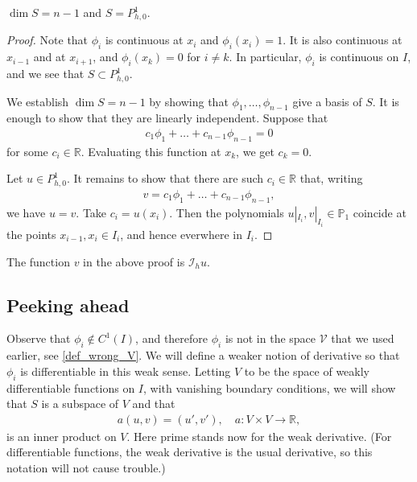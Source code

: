 \documentclass[12pt,oneside,final]{amsart}
\def\R{\mathbb R}
\def\I{\mathcal I}
\begin{document}
\begin{lemma}
$\dim S = n-1$ and $S = P^1_{h,0}$.
\end{lemma}
\begin{proof}
Note that $\phi_i$ is continuous at $x_i$ and $\phi_i(x_i) = 1$.
It is also continuous at $x_{i-1}$ and at $x_{i+1}$,
and $\phi_i(x_k) = 0$ for $i \ne k$. In particular, $\phi_i$ is continuous on $I$, and we see that $S \subset P_{h,0}^1$.

We establish $\dim S = n - 1$ by showing that $\phi_1,\dots,\phi_{n-1}$ give a basis of $S$.
It is enough to show that they are linearly independent.
Suppose that 
    \begin{align*}
c_1 \phi_1 + \dots + c_{n-1} \phi_{n-1} = 0
    \end{align*}
for some $c_i \in \R$. Evaluating this function at $x_k$, we get 
$c_k = 0$.

Let $u \in P^1_{h,0}$. It remains to show that there are such $c_i \in \R$ that, writing
    \begin{align*}
v = c_1 \phi_1 + \dots + c_{n-1} \phi_{n-1},
    \end{align*}
we have $u = v$. 
Take $c_i = u(x_i)$. Then 
the polynomials
$u|_{I_i}, v|_{I_i} \in \mathbb P_1$ 
coincide at the points $x_{i-1}, x_i \in I_i$, and hence everwhere in $I_i$.
\end{proof}

\begin{remark}\label{rem_Ih}
The function $v$ in the above proof is $\I_h u$.
\end{remark}

\subsection{Peeking ahead\label{sec_peek}}

Observe that $\phi_i \notin C^1(I)$, and therefore $\phi_i$ is not in the space $\mathcal V$
that we used earlier, see \eqref{def_wrong_V}. We will define a weaker notion of derivative so that $\phi_i$ is differentiable in this weak sense. Letting $V$ to be the space of weakly differentiable functions on $I$, with vanishing boundary conditions, 
we will show that $S$ is a subspace of $V$ and that 
    \begin{align*}
a(u, v) = (u', v'), \quad a : V \times V \to \mathbb R,
    \end{align*}
is an inner product on $V$. Here prime stands now for the weak derivative. (For differentiable functions, the weak derivative is the usual derivative, so this notation will not cause trouble.)
\end{document}
